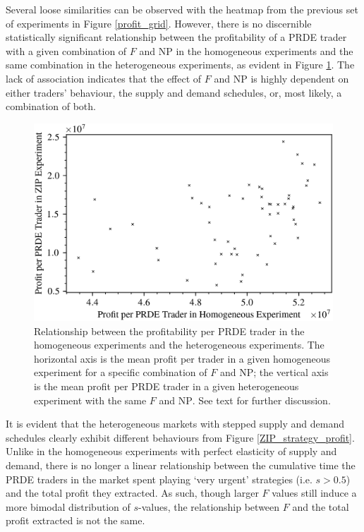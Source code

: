 \documentclass[a4paper,twoside]{article}
\begin{document}
Several loose similarities can be observed with the heatmap from the previous set of experiments in Figure \ref{profit_grid}.
However, there is no discernible statistically significant relationship between the profitability of a PRDE trader with a given combination of $F$ and $\mathrm{NP}$ in the homogeneous experiments and the same combination in the heterogeneous experiments, as evident in Figure \ref{homo_zip_scatter}.
The lack of association indicates that the effect of $F$ and $\mathrm{NP}$ is highly dependent on either traders' behaviour, the supply and demand schedules, or, most likely, a combination of both.

\begin{figure}[htbp]
    \centerline{\includegraphics[width=\columnwidth]{homo_zip_scatter.png}}
    \caption{
        Relationship between the profitability per PRDE trader in the homogeneous experiments and the heterogeneous experiments.
        The horizontal axis is the mean profit per trader in a given homogeneous experiment for a specific combination of $F$ and $\mathrm{NP}$; the vertical axis is the mean profit per PRDE trader in a given heterogeneous experiment with the same $F$ and $\mathrm{NP}$.
        See text for further discussion.
    }
    \label{homo_zip_scatter}
\end{figure}

It is evident that the heterogeneous markets with stepped supply and demand schedules clearly exhibit different behaviours from Figure \ref{ZIP_strategy_profit}.
Unlike in the homogeneous experiments with perfect elasticity of supply and demand, there is no longer a linear relationship between the cumulative time the PRDE traders in the market spent playing `very urgent' strategies (i.e. $s>0.5$) and the total profit they extracted.
As such, though larger $F$ values still induce a more bimodal distribution of $s$-values, the relationship between $F$ and the total profit extracted is not the same.
\end{document}
